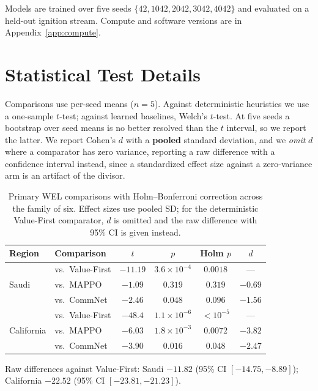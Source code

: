 \documentclass[letterpaper]{article}
\begin{document}
Models are trained over five seeds $\{42,1042,2042,3042,4042\}$ and evaluated on a held-out ignition stream. Compute and software versions are in Appendix~\ref{app:compute}.

\section{Statistical Test Details}
\label{app:statistics}

Comparisons use per-seed means ($n=5$). Against deterministic heuristics we use a one-sample $t$-test; against learned baselines, Welch's $t$-test. At five seeds a bootstrap over seed means is no better resolved than the $t$ interval, so we report the latter. We report Cohen's $d$ with a \textbf{pooled} standard deviation, and we \emph{omit} $d$ where a comparator has zero variance, reporting a raw difference with a confidence interval instead, since a standardized effect size against a zero-variance arm is an artifact of the divisor.

\begin{table}[H]
	\centering
	\caption{Primary WEL comparisons with Holm--Bonferroni correction across the family of six. Effect sizes use pooled SD; for the deterministic Value-First comparator, $d$ is omitted and the raw difference with 95\% CI is given instead.}
	\label{tab:statistics}
	\footnotesize
	\setlength{\tabcolsep}{2.5pt}
	\begin{tabular}{llcccc}
		\toprule
		Region & Comparison & $t$ & $p$ & Holm $p$ & $d$ \\
		\midrule
		\multirow{3}{*}{Saudi}
		& vs.\ Value-First & $-11.19$ & $3.6\!\times\!10^{-4}$ & $0.0018$ & --- \\
		& vs.\ MAPPO & $-1.09$ & $0.319$ & $0.319$ & $-0.69$ \\
		& vs.\ CommNet & $-2.46$ & $0.048$ & $0.096$ & $-1.56$ \\
		\midrule
		\multirow{3}{*}{California}
		& vs.\ Value-First & $-48.4$ & $1.1\!\times\!10^{-6}$ & $<10^{-5}$ & --- \\
		& vs.\ MAPPO & $-6.03$ & $1.8\!\times\!10^{-3}$ & $0.0072$ & $-3.82$ \\
		& vs.\ CommNet & $-3.90$ & $0.016$ & $0.048$ & $-2.47$ \\
		\bottomrule
	\end{tabular}
\end{table}

Raw differences against Value-First: Saudi $-11.82$ (95\% CI $[-14.75, -8.89]$); California $-22.52$ (95\% CI $[-23.81, -21.23]$).
\end{document}
